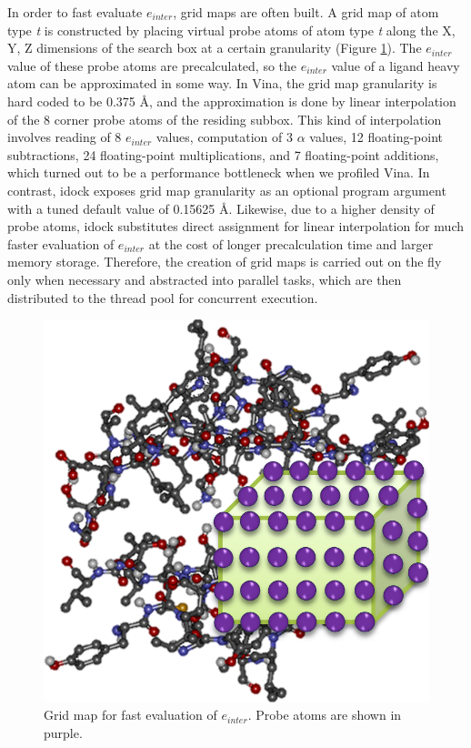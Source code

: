 In order to fast evaluate $e_{inter}$, grid maps are often built. A grid map of atom type \textit{t} is constructed by placing virtual probe atoms of atom type \textit{t} along the X, Y, Z dimensions of the search box at a certain granularity (Figure \ref{idock:GridMap}). The $e_{inter}$ value of these probe atoms are precalculated, so the $e_{inter}$ value of a ligand heavy atom can be approximated in some way. In Vina, the grid map granularity is hard coded to be 0.375 \AA, and the approximation is done by linear interpolation of the 8 corner probe atoms of the residing subbox. This kind of interpolation involves reading of 8 $e_{inter}$ values, computation of 3 $\alpha$ values, 12 floating-point subtractions, 24 floating-point multiplications, and 7 floating-point additions, which turned out to be a performance bottleneck when we profiled Vina. In contrast, idock exposes grid map granularity as an optional program argument with a tuned default value of 0.15625 \AA. Likewise, due to a higher density of probe atoms, idock substitutes direct assignment for linear interpolation for much faster evaluation of $e_{inter}$ at the cost of longer precalculation time and larger memory storage. Therefore, the creation of grid maps is carried out on the fly only when necessary and abstracted into parallel tasks, which are then distributed to the thread pool for concurrent execution.

\begin{figure}
\centering
\includegraphics[width=\linewidth]{../idock/GridMap.png}
\caption{Grid map for fast evaluation of $e_{inter}$. Probe atoms are shown in purple.}
\label{idock:GridMap}
\end{figure}

